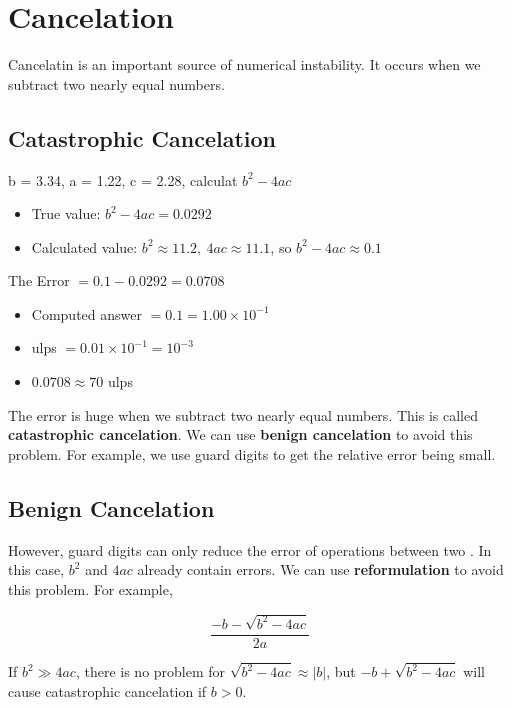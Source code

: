 \newpage
{}

\section{Cancelation}

Cancelatin is an important source of numerical instability. It occurs when we subtract two nearly equal numbers.

\subsection{Catastrophic Cancelation}

\begin{eg}
    b = 3.34, a = 1.22, c = 2.28, calculat \(b^2-4ac\)
\end{eg}
\begin{itemize}
    \item True value: \(b^2-4ac = 0.0292\)
    \item Calculated value: $b^2 \approx 11.2,\ 4ac \approx 11.1$, so $b^2-4ac \approx 0.1$
\end{itemize}
The Error $= 0.1 - 0.0292 = 0.0708$
\begin{itemize}
    \item Computed answer $= 0.1 = 1.00 \times 10^{-1}$
    \item ulps $= 0.01 \times 10^{-1} = 10^{-3}$
    \item $0.0708 \approx 70$ ulps
\end{itemize}

The error is huge when we subtract two nearly equal numbers. This is called \textbf{catastrophic cancelation}. We can use \textbf{benign cancelation} to avoid this problem. For example, we use guard digits to get the relative error being small.

\subsection{Benign Cancelation}

However, guard digits can only reduce the error of operations between two . In this case, $b^2$ and $4ac$ already contain errors. We can use \textbf{reformulation} to avoid this problem. For example, 
\begin{eg}
    \[
        \frac{-b - \sqrt{b^2-4ac}}{2a} \tag{1.3.1}
    \]
\end{eg}
If $b^2 \gg 4ac$, there is no problem for $\sqrt{b^2-4ac} \approx |b|$, but $-b + \sqrt{b^2-4ac}$ will cause catastrophic cancelation if $b>0$. 

